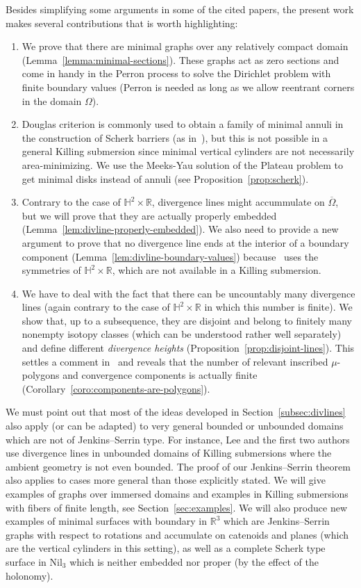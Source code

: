 \documentclass[a4paper,10pt,reqno]{amsart}
\newcommand{\R}{\mathbb{R}}
\theoremstyle{definition}
\theoremstyle{remark}
\numberwithin{equation}{section}
\begin{document}
Besides simplifying some arguments in some of the cited papers, the present work makes several contributions that is worth highlighting:
\begin{enumerate}
	\item We prove that there are minimal graphs over any relatively compact domain (Lemma~\ref{lemma:minimal-sections}). These graphs act as zero sections and come in handy in the Perron process to solve the Dirichlet problem with finite boundary values (Perron is needed as long as we allow reentrant corners in the domain $\Omega$).
	\item Douglas criterion is commonly used to obtain a family of minimal annuli in the construction of Scherk barriers (as in~\cite{NR}), but this is not possible in a general Killing submersion since minimal vertical cylinders are not necessarily area-minimizing. We use the Meeks-Yau solution of the Plateau problem to get minimal disks instead of annuli (see Proposition~\ref{prop:scherk}).

	\item Contrary to the case of $\mathbb{H}^2\times\mathbb{R}$, divergence lines might accummulate on $\overline\Omega$, but we will prove that they are actually properly embedded (Lemma~\ref{lem:divline-properly-embedded}). We also need to provide a new argument to prove that no divergence line ends at the interior of a boundary component (Lemma~\ref{lem:divline-boundary-values}) because~\cite{MRR} uses the symmetries of $\mathbb{H}^2\times\mathbb{R}$, which are not available in a Killing submersion.
	\item We have to deal with the fact that there can be uncountably many divergence lines (again contrary to the case of $\mathbb{H}^2\times\R$ in which this number is finite). We show that, up to a subsequence, they are disjoint and belong to finitely many nonempty isotopy classes (which can be understood rather well separately) and define different \emph{divergence heights} (Proposition~\ref{prop:disjoint-lines}). This settles a comment in~\cite[Rmk.~4.5]{MRR} and reveals that the number of relevant inscribed $\mu$-polygons and convergence components is actually finite (Corollary~\ref{coro:components-are-polygons}).
\end{enumerate}
We must point out that most of the ideas developed in Section~\ref{subsec:divlines} also apply (or can be adapted) to very general bounded or unbounded domains which are not of Jenkins--Serrin type. For instance, Lee and the first two authors~\cite[\S4]{DLM} use divergence lines in unbounded domains of Killing submersions where the ambient geometry is not even bounded. The proof of our Jenkins--Serrin theorem also applies to cases more general than those explicitly stated. We will give examples of graphs over immersed domains and examples in Killing submersions with fibers of finite length, see Section~\ref{sec:examples}. We will also produce new examples of minimal surfaces with boundary in $\R^3$ which are Jenkins--Serrin graphs with respect to rotations and accumulate on catenoids and planes (which are the vertical cylinders in this setting), as well as a complete Scherk type surface in $\mathrm{Nil}_3$ which is neither embedded nor proper (by the effect of the holonomy).
\end{document}
